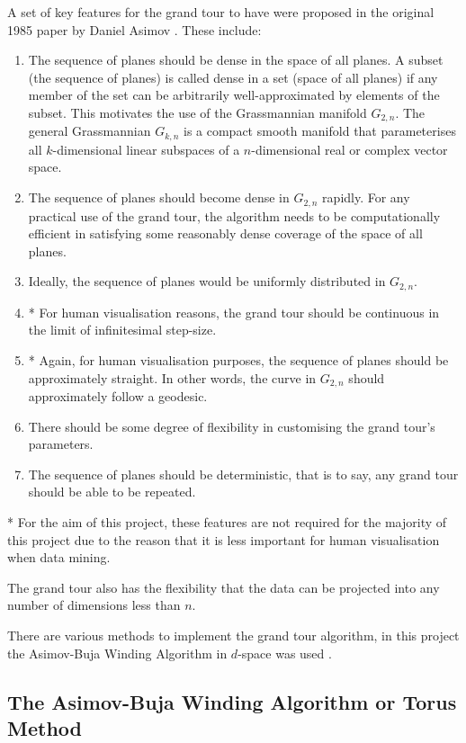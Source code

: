 \documentclass[a4paper,11pt,twoside]{article}
\begin{document}
A set of key features for the grand tour to have were proposed in the original 1985 paper by Daniel Asimov \cite{Asimov1985}. These include:
\begin{enumerate}
\item The sequence of planes should be dense in the space of all planes. A subset (the sequence of planes) is called dense in a set (space of all planes) if any member of the set can be arbitrarily well-approximated by elements of the subset. This motivates the use of the Grassmannian manifold $G_{2,n}$. The general Grassmannian $G_{k,n}$ is a compact smooth manifold that parameterises all $k$-dimensional linear subspaces of a $n$-dimensional real or complex vector space.
\item The sequence of planes should become dense in $G_{2,n}$ rapidly. For any practical use of the grand tour, the algorithm needs to be computationally efficient in satisfying some reasonably dense coverage of the space of all planes.
\item Ideally, the sequence of planes would be uniformly distributed in $G_{2,n}$.
\item* For human visualisation reasons, the grand tour should be continuous in the limit of infinitesimal step-size.
\item* Again, for human visualisation purposes, the sequence of planes should be approximately straight. In other words, the curve in $G_{2,n}$ should approximately follow a geodesic.
\item There should be some degree of flexibility in customising the grand tour's parameters.
\item The sequence of planes should be deterministic, that is to say, any grand tour should be able to be repeated.
\end{enumerate}

* For the aim of this project, these features are not required for the majority of this project due to the reason that it is less important for human visualisation when data mining.
\newline

The grand tour also has the flexibility that the data can be projected into any number of dimensions less than $n$.
\newline

There are various methods to implement the grand tour algorithm, in this project the Asimov-Buja Winding Algorithm in $d$-space was used \cite{Asimov1985}\cite{Wegman2002}. 

\subsection{The Asimov-Buja Winding Algorithm or Torus Method}
\end{document}

